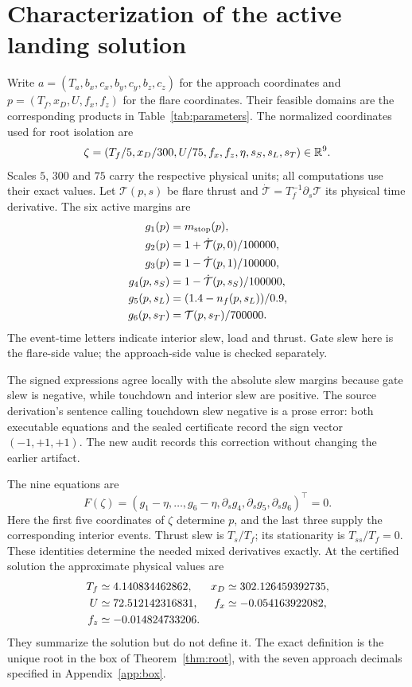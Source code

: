 \section{Characterization of the active landing solution}\label{sec:active}
Write $a=(T_a,b_x,c_x,b_y,c_y,b_z,c_z)$ for the approach coordinates and $p=(T_f,x_D,U,f_x,f_z)$ for the flare coordinates. Their feasible domains are the corresponding products in Table~\ref{tab:parameters}. The normalized coordinates used for root isolation are
\begin{equation}\label{eq:zcoords}
 \zeta=(T_f/5,x_D/300,U/75,f_x,f_z,\eta,s_S,s_L,s_T)\in\mathbb R^9.
\end{equation}
Scales $5$, $300$ and $75$ carry the respective physical units; all computations use their exact values. Let $\mathcal T(p,s)$ be flare thrust and $\dot{\mathcal T}=T_f^{-1}\partial_s\mathcal T$ its physical time derivative. The six active margins are
\begin{align}\label{eq:active}
 g_1(p)&=m_{\rm stop}(p),\notag\\
 g_2(p)&=1+\dot{\mathcal T}(p,0)/100000,\notag\\
 g_3(p)&=1-\dot{\mathcal T}(p,1)/100000,\notag\\
 g_4(p,s_S)&=1-\dot{\mathcal T}(p,s_S)/100000,\notag\\
 g_5(p,s_L)&=(1.4-n_f(p,s_L))/0.9,\notag\\
 g_6(p,s_T)&=\mathcal T(p,s_T)/700000.
\end{align}
The event-time letters indicate interior slew, load and thrust. Gate slew here is the flare-side value; the approach-side value is checked separately.

The signed expressions agree locally with the absolute slew margins because gate slew is negative, while touchdown and interior slew are positive. The source derivation's sentence calling touchdown slew negative is a prose error: both executable equations and the sealed certificate record the sign vector $(-1,+1,+1)$. The new audit records this correction without changing the earlier artifact.

The nine equations are
\begin{equation}\label{eq:root}
 F(\zeta)=\left(g_1-\eta,\ldots,g_6-\eta,
 \partial_sg_4,\partial_sg_5,\partial_sg_6\right)^\top=0.
\end{equation}
Here the first five coordinates of $\zeta$ determine $p$, and the last three supply the corresponding interior events. Thrust slew is $T_s/T_f$; its stationarity is $T_{ss}/T_f=0$. These identities determine the needed mixed derivatives exactly. At the certified solution the approximate physical values are
\begin{align}\label{eq:physical}
 T_f&\simeq4.140834462862,&x_D&\simeq302.126459392735,\notag\\
 U&\simeq72.512142316831,&f_x&\simeq-0.054163922082,\notag\\
 f_z&\simeq-0.014824733206.&&
\end{align}
They summarize the solution but do not define it. The exact definition is the unique root in the box of Theorem~\ref{thm:root}, with the seven approach decimals specified in Appendix~\ref{app:box}.

